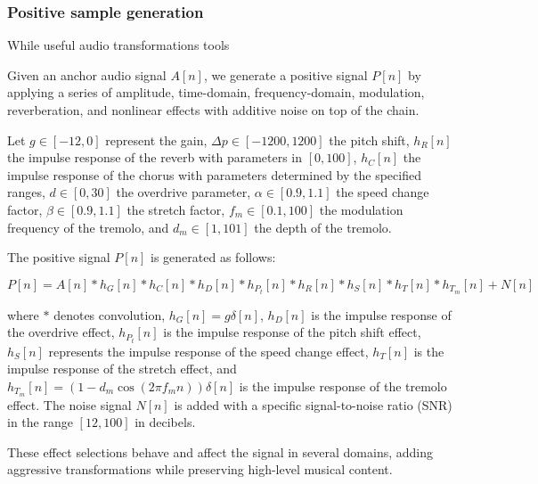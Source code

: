\subsubsection{Positive sample generation}

While useful audio transformations tools \cite{Spijkervet2021Spijkervet/torchaudio-augmentations:V1.0}

Given an anchor audio signal $A[n]$, we generate a positive signal $P[n]$ by applying a series of amplitude, time-domain, frequency-domain, modulation, reverberation, and nonlinear effects with additive noise on top of the chain. 

Let $g \in [-12, 0]$ represent the gain, $\Delta p \in [-1200, 1200]$ the pitch shift, $h_R[n]$ the impulse response of the reverb with parameters in $[0, 100]$, $h_C[n]$ the impulse response of the chorus with parameters determined by the specified ranges, $d \in [0, 30]$ the overdrive parameter, $\alpha \in [0.9, 1.1]$ the speed change factor, $\beta \in [0.9, 1.1]$ the stretch factor, $f_m \in [0.1, 100]$ the modulation frequency of the tremolo, and $d_m \in [1, 101]$ the depth of the tremolo. 

The positive signal $P[n]$ is generated as follows:

\begin{equation}\label{eq:positive_signal}
P[n] = A[n] \ast h_{G}[n] \ast h_{C}[n] \ast h_{D}[n] \ast h_{P_t}[n] \ast h_{R}[n] \ast h_{S}[n] \ast h_{T}[n] \ast h_{T_m}[n] + N[n]
\end{equation}

where $\ast$ denotes convolution, $h_{G}[n] = g \delta[n]$, $h_{D}[n]$ is the impulse response of the overdrive effect, $h_{P_t}[n]$ is the impulse response of the pitch shift effect, $h_{S}[n]$ represents the impulse response of the speed change effect, $h_{T}[n]$ is the impulse response of the stretch effect, and $h_{T_m}[n] = (1 - d_m \cos(2 \pi f_m n))\delta[n]$ is the impulse response of the tremolo effect. The noise signal $N[n]$ is added with a specific signal-to-noise ratio (SNR) in the range $[12, 100]$ in decibels.

These effect selections behave and affect the signal in several domains, adding aggressive transformations while preserving high-level musical content.

